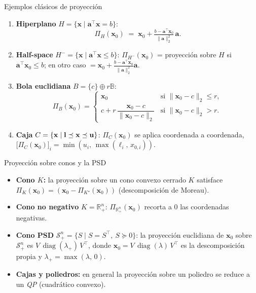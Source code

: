 \documentclass[10pt,aspectratio=169]{beamer}
\newcommand{\R}{\mathbb{R}}
\newcommand{\x}{\mathbf{x}}
\newcommand{\xa}{\mathbf{a}}
\newcommand{\0}{\mathbf{0}}
\newcommand{\1}{\mathbf{1}}
\newcommand{\Sym}{\mathcal{S}}
\begin{document}
\begin{frame}{Ejemplos clásicos de proyección}
  \begin{enumerate}
    \item \textbf{Hiperplano} $H = \{\x\mid \xa^\top\x = b\}$:
      \[
        \Pi_H(\x_0) \;=\; \x_0 + \tfrac{b-\xa^\top\x_0}{\|\xa\|_2^2}\,\xa.
      \]
    \item \textbf{Half-space} $H^- = \{\x\mid \xa^\top\x \le b\}$:
      $\Pi_{H^-}(\x_0)$ = proyección sobre $H$ si $\xa^\top\x_0 \le b$; en otro caso $= \x_0 + \tfrac{b-\xa^\top\x_0}{\|\xa\|_2^2}\xa$.
    \item \textbf{Bola euclidiana} $B=\{c\}\oplus r\mathbb{B}$:
      \[
        \Pi_B(\x_0)=\begin{cases}
                      \x_0 & \text{si } \|\x_0-c\|_2\le r,\\[0.2em]
                      c + r\,\dfrac{\x_0-c}{\|\x_0-c\|_2} & \text{si } \|\x_0-c\|_2>r.
                    \end{cases}
      \]
    \item \textbf{Caja} $C = \{\x\mid \text{\textbf l}\preceq\x\preceq\text{\textbf u}\}$: $\Pi_C(\x_0)$
      se aplica coordenada a coordenada,
      $\bigl[\Pi_C(\x_0)\bigr]_i = \min(u_i,\,\max(\ell_i,\,x_{0,i}))$.
  \end{enumerate}
\end{frame}

\begin{frame}{Proyección sobre conos y la PSD}
  \begin{itemize}
    \item \textbf{Cono $K$:} la proyección sobre un cono convexo cerrado
          $K$ satisface $\Pi_K(\x_0) = (\x_0 - \Pi_{K^\star}(\x_0))$ (descomposición de Moreau).
    \item \textbf{Cono no negativo} $K=\R_+^n$:
      $\Pi_{\R_+^n}(\x_0)$ recorta a $0$ las coordenadas negativas.
    \item \textbf{Cono PSD} $\Sym_+^n = \{S\mid S=S^\top,\ S\succeq 0\}$:
      la proyección euclidiana de $\x_0$ sobre $\Sym_+^n$ es
      $V\,\operatorname{diag}(\lambda_+)\,V^\top$, donde $\x_0 = V\,\operatorname{diag}(\lambda)\,V^\top$
      es la descomposición propia y $\lambda_+ = \max(\lambda,\,0)$.
    \item \textbf{Cajas y poliedros:} en general la proyección sobre un
          poliedro se reduce a un \emph{QP} (cuadrático convexo).
  \end{itemize}
\end{frame}
\end{document}
